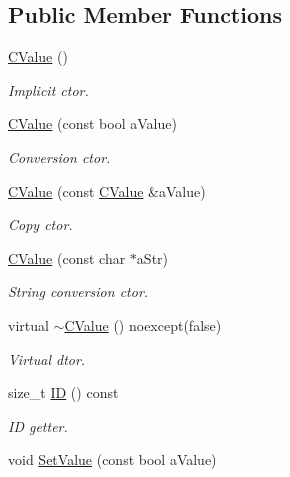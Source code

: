 \subsection*{Public Member Functions}
\begin{DoxyCompactItemize}
\item 
\hyperlink{class_c_value__bool_1_1_c_value_a16e53bf59cc84c4cf0527e08f1f2fde4}{C\+Value} ()
\begin{DoxyCompactList}\small\item\em Implicit c\textquotesingle{}tor. \end{DoxyCompactList}\item 
\hyperlink{class_c_value__bool_1_1_c_value_af0fe821e94aae8cbef4e3b427748ddd8}{C\+Value} (const bool a\+Value)
\begin{DoxyCompactList}\small\item\em Conversion c\textquotesingle{}tor. \end{DoxyCompactList}\item 
\hyperlink{class_c_value__bool_1_1_c_value_abc234c189a9447eb7859f8c7731122e1}{C\+Value} (const \hyperlink{class_c_value__bool_1_1_c_value}{C\+Value} \&a\+Value)
\begin{DoxyCompactList}\small\item\em Copy c\textquotesingle{}tor. \end{DoxyCompactList}\item 
\hyperlink{class_c_value__bool_1_1_c_value_a8883e123d12aed4cd3ca24db42ea0049}{C\+Value} (const char $\ast$a\+Str)
\begin{DoxyCompactList}\small\item\em String conversion c\textquotesingle{}tor. \end{DoxyCompactList}\item 
virtual \hyperlink{class_c_value__bool_1_1_c_value_acdc5cb2d30dedc5f34d586e2560eea79}{$\sim$\+C\+Value} () noexcept(false)
\begin{DoxyCompactList}\small\item\em Virtual d\textquotesingle{}tor. \end{DoxyCompactList}\item 
size\+\_\+t \hyperlink{class_c_value__bool_1_1_c_value_a028335ed71781b92b96dfb51e1118eda}{ID} () const
\begin{DoxyCompactList}\small\item\em ID getter. \end{DoxyCompactList}\item 
void \hyperlink{class_c_value__bool_1_1_c_value_ab39b87a635a8d3651fa9bd1d06669d82}{Set\+Value} (const bool a\+Value)

\end{DoxyCompactItemize}
